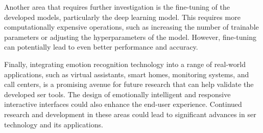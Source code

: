 Another area that requires further investigation is the fine-tuning of the developed models, particularly the deep learning model. This requires more computationally expensive operations, such as increasing the number of trainable parameters or adjusting the hyperparameters of the model. However, fine-tuning can potentially lead to even better performance and accuracy.

Finally, integrating emotion recognition technology into a range of real-world applications, such as virtual assistants, smart homes, monitoring systems, and call centers, is a promising avenue for future research that can help validate the developed \ac{ser} tools. The design of emotionally intelligent and responsive interactive interfaces could also enhance the end-user experience. Continued research and development in these areas could lead to significant advances in \ac{ser} technology and its applications.